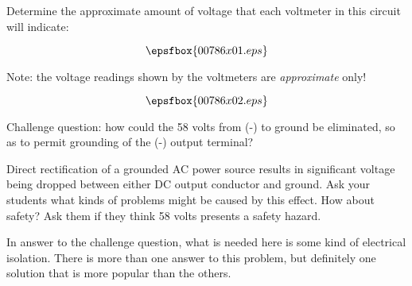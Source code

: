 

Determine the approximate amount of voltage that each voltmeter in this circuit will indicate:

$$\epsfbox{00786x01.eps}$$







Note: the voltage readings shown by the voltmeters are {\it approximate} only!

$$\epsfbox{00786x02.eps}$$

\vskip 10pt

Challenge question: how could the 58 volts from (-) to ground be eliminated, so as to permit grounding of the (-) output terminal?







Direct rectification of a grounded AC power source results in significant voltage being dropped between either DC output conductor and ground.  Ask your students what kinds of problems might be caused by this effect.  How about safety?  Ask them if they think 58 volts presents a safety hazard.

In answer to the challenge question, what is needed here is some kind of electrical isolation.  There is more than one answer to this problem, but definitely one solution that is more popular than the others.




